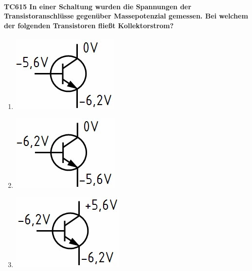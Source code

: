 \documentclass[8pt]{article}
\begin{document}
\begin{enumerate}
\begin{enumerate}[nolistsep,label=\Alph*]
{\begin{enumerate}[nolistsep,label=\Alph*]
\paragraph*{TC615 In einer Schaltung wurden die Spannungen der Transistoranschlüsse gegenüber Massepotenzial gemessen. Bei welchem der folgenden Transistoren fließt Kollektorstrom?}
\begin{enumerate}[nolistsep,label=\Alph*]
\item
	\begin{center}
		\begin{minipage}{\linewidth}
			\centering
			\includegraphics[scale=1.0]{pics/tc615_a.jpg}
		\end{minipage}
	\end{center}
\item
	\begin{center}
		\begin{minipage}{\linewidth}
			\centering
			\includegraphics[scale=1.0]{pics/tc615_b.jpg}
		\end{minipage}
	\end{center}
\item
	\begin{center}
		\begin{minipage}{\linewidth}
			\centering
			\includegraphics[scale=1.0]{pics/tc615_c.jpg}
		\end{minipage}

\end{center}
\end{enumerate}
\end{enumerate}}
\end{enumerate}
\end{enumerate}
\end{document}
